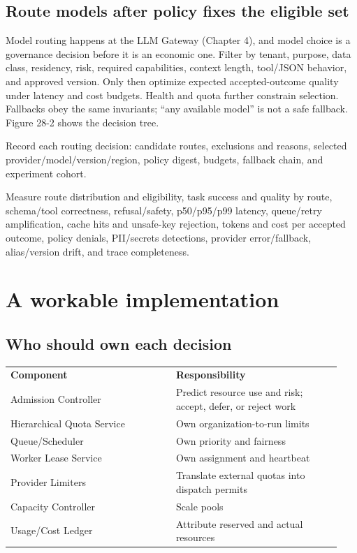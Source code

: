 \subsection{Route models after policy fixes the eligible set}

Model routing happens at the LLM Gateway (Chapter 4), and model choice is a governance decision before it is an economic one. Filter by tenant, purpose, data class, residency, risk, required capabilities, context length, tool/JSON behavior, and approved version. Only then optimize expected accepted-outcome quality under latency and cost budgets. Health and quota further constrain selection. Fallbacks obey the same invariants; “any available model” is not a safe fallback. Figure 28-2 shows the decision tree.\par


Record each routing decision: candidate routes, exclusions and reasons, selected provider/model/version/region, policy digest, budgets, fallback chain, and experiment cohort.\par

Measure route distribution and eligibility, task success and quality by route, schema/tool correctness, refusal/safety, p50/p95/p99 latency, queue/retry amplification, cache hits and unsafe-key rejection, tokens and cost per accepted outcome, policy denials, PII/secrets detections, provider error/fallback, alias/version drift, and trace completeness.\par

\section{A workable implementation}

\subsection{Who should own each decision}

\BookTableStart
\small
\begin{tabular}{@{}Y{0.4700\linewidth}Y{0.4700\linewidth}@{}}
\color{white}\bfseries \textbf{Component} & \color{white}\bfseries \textbf{Responsibility} \\
Admission Controller & Predict resource use and risk; accept, defer, or reject work \\
Hierarchical Quota Service & Own organization-to-run limits \\
Queue/Scheduler & Own priority and fairness \\
Worker Lease Service & Own assignment and heartbeat \\
Provider Limiters & Translate external quotas into dispatch permits \\
Capacity Controller & Scale pools \\
Usage/Cost Ledger & Attribute reserved and actual resources \\
\end{tabular}
\BookTableEnd

